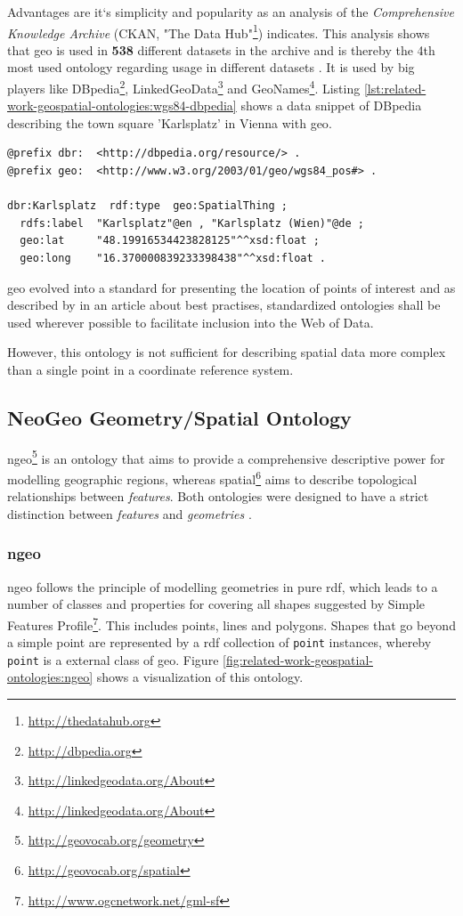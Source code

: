 \documentclass[draft,final]{vutinfth} %
\begin{document}
Advantages are it`s simplicity and popularity as an analysis of the \textit{Comprehensive Knowledge Archive} (CKAN, "The Data Hub"\footnote{\url{http://thedatahub.org}}) indicates. This analysis shows that \gls{geo} is used in \textbf{538} different datasets in the archive and is thereby the 4th most used ontology regarding usage in different datasets \cite{research_group:_akws_lodstats_????}. It is used by big players like DBpedia\footnote{\url{http://dbpedia.org}}, LinkedGeoData\footnote{\url{http://linkedgeodata.org/About}} and GeoNames\footnote{\url{http://linkedgeodata.org/About}}. 
Listing \ref{lst:related-work-geospatial-ontologies:wgs84-dbpedia} shows a data snippet of DBpedia describing the town square 'Karlsplatz' in Vienna with \gls{geo}.

\begin{lstlisting}[frame=single, caption=Snippet of DBpedia, label={lst:related-work-geospatial-ontologies:wgs84-dbpedia}]
@prefix dbr:  <http://dbpedia.org/resource/> .
@prefix geo:  <http://www.w3.org/2003/01/geo/wgs84_pos#> .

dbr:Karlsplatz  rdf:type  geo:SpatialThing ;
  rdfs:label  "Karlsplatz"@en , "Karlsplatz (Wien)"@de ;
  geo:lat     "48.19916534423828125"^^xsd:float ;
  geo:long    "16.370000839233398438"^^xsd:float .
\end{lstlisting}

\gls{geo} evolved into a standard for presenting the location of points of interest and as described by \cite{hyland_best_2014} in an article about best practises, standardized ontologies shall be used wherever possible to facilitate
inclusion into the Web of Data.

However, this ontology is not sufficient for describing spatial data more complex than a single point in a coordinate reference system.

\subsection{NeoGeo Geometry/Spatial Ontology}
\gls{ngeo}\footnote{\url{http://geovocab.org/geometry}} is an ontology that aims to provide a comprehensive descriptive power for modelling geographic regions, whereas \gls{spatial}\footnote{\url{http://geovocab.org/spatial}} aims to describe topological relationships between \textit{features}. Both ontologies were designed to have a strict distinction between \textit{features} and \textit{geometries} \cite{norton_neogeo_2012}.

\subsubsection{\gls{ngeo}} 
\gls{ngeo} follows the principle of modelling geometries in pure \gls{rdf}, which leads to a number of classes and properties for covering all shapes suggested by Simple Features Profile\footnote{\url{http://www.ogcnetwork.net/gml-sf}}. This includes points, lines and polygons. Shapes that go beyond a simple point are represented by a \gls{rdf} collection of \texttt{point} instances, whereby \texttt{point} is a external class of \gls{geo}. Figure \ref{fig:related-work-geospatial-ontologies:ngeo} shows a visualization of this ontology.
\end{document}
